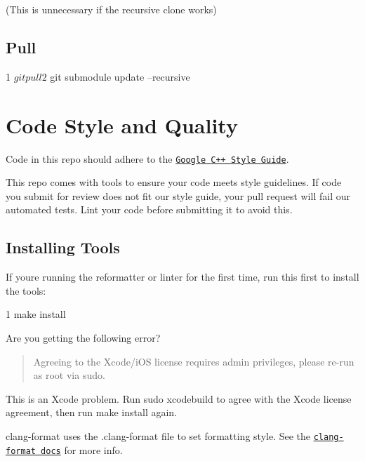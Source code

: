 (This is unnecessary if the recursive clone works)




\subsection*{Pull}


\begin{DoxyCode}
1 $ git pull
2 $ git submodule update --recursive
\end{DoxyCode}


\section*{Code Style and Quality}

Code in this repo should adhere to the \href{https://google.github.io/styleguide/cppguide.html}{\tt Google C++ Style Guide}.

This repo comes with tools to ensure your code meets style guidelines. If code you submit for review does not fit our style guide, your pull request will fail our automated tests. Lint your code before submitting it to avoid this.

\subsection*{Installing Tools}

If you\textquotesingle{}re running the reformatter or linter for the first time, run this first to install the tools\+:


\begin{DoxyCode}
1 make install
\end{DoxyCode}


Are you getting the following error?

\begin{quote}
Agreeing to the Xcode/i\+O\+S license requires admin privileges, please re-\/run as root via sudo. \end{quote}


This is an Xcode problem. Run {\ttfamily sudo xcodebuild} to agree with the Xcode license agreement, then run {\ttfamily make install} again.

clang-\/format uses the {\ttfamily .clang-\/format} file to set formatting style. See the \href{http://clang.llvm.org/docs/ClangFormat.html}{\tt clang-\/format docs} for more info.

